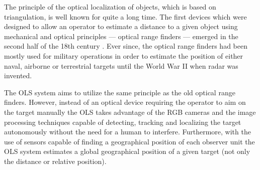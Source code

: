 

The principle of the optical localization of objects, which is based on triangulation, is well known for quite a long time. The first devices which were designed to allow an operator to estimate a distance to a given object using mechanical and optical principles --- optical range finders --- emerged in the second half of the 18th century \cite{bud1998instruments}. Ever since, the optical range finders had been mostly used for military operations in order to estimate the position of either naval, airborne or terrestrial targets until the World War II when radar was invented.

The OLS system aims to utilize the same principle as the old optical range finders. However, instead of an optical device requiring the operator to aim on the target manually the OLS takes advantage of the RGB cameras and the image processing techniques capable of detecting, tracking and localizing the target autonomously without the need for a human to interfere. Furthermore, with the use of sensors capable of finding a geographical position of each observer unit the OLS system estimates a global geographical position of a given target (not only the distance or relative position).



